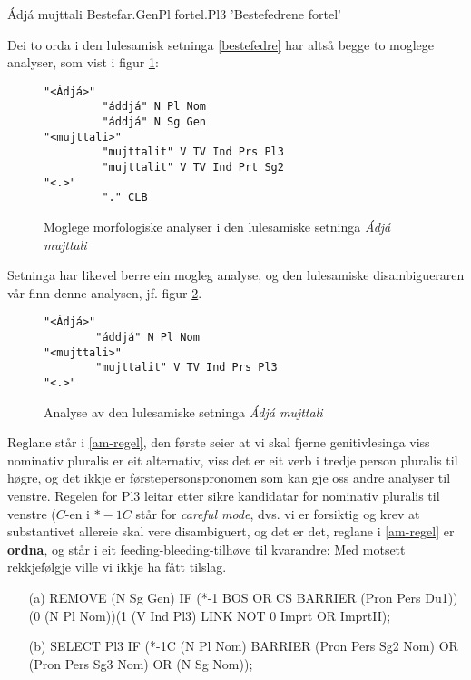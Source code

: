 \documentclass[a4paper,norsk]{article}
\begin{document}
\begin{example}\label{bestefedre}
\gll Ádjá mujttali
    Bestefar.GenPl fortel.Pl3
\glt 'Bestefedrene fortel'    
\glend
\end{example}%

Dei to orda i den lulesamisk setninga \ref{bestefedre} har altså begge to moglege analyser, som vist i figur \ref{am-multi}:

\begin{figure}[htbp]
\begin{center}
\begin{verbatim}
"<Ádjá>"
         "áddjá" N Pl Nom
         "áddjá" N Sg Gen
"<mujttali>"
         "mujttalit" V TV Ind Prs Pl3
         "mujttalit" V TV Ind Prt Sg2
"<.>"
         "." CLB
\end{verbatim}
\caption{Moglege morfologiske analyser i den lulesamiske setninga \textit{Ádjá mujttali}}
\label{am-multi}
\end{center}
\end{figure}

Setninga har likevel berre ein mogleg analyse, og den lulesamiske disambigueraren vår finn denne analysen, jf. figur \ref{am}. %

\begin{figure}[htbp]
\begin{center}
\begin{verbatim}
"<Ádjá>"
        "áddjá" N Pl Nom
"<mujttali>"
        "mujttalit" V TV Ind Prs Pl3
"<.>"
\end{verbatim}
\caption{Analyse av den lulesamiske setninga \textit{Ádjá mujttali}}
\label{am}
\end{center}
\end{figure}

Reglane står i \ref{am-regel}, den første seier at vi skal fjerne genitivlesinga viss nominativ pluralis er eit alternativ, viss det er eit verb i tredje person pluralis til høgre, og det ikkje er førstepersonspronomen som kan gje  oss andre analyser til venstre. Regelen for Pl3 leitar etter sikre kandidatar for nominativ pluralis til venstre ($C$-en i $*-1C$ står for \textit{careful mode}, dvs. vi er forsiktig og krev at substantivet allereie skal vere disambiguert, og det er det, reglane i \ref{am-regel} er \textbf{ordna}, og står i eit feeding-bleeding-tilhøve til kvarandre: Med motsett rekkjefølgje ville vi ikkje ha fått tilslag. %

\begin{example}\label{am-regel}
\begin{itemize}
\item[(a)] REMOVE (N Sg Gen) IF (*-1 BOS OR CS BARRIER (Pron Pers Du1))(0 (N Pl Nom))(1 (V Ind Pl3) LINK NOT 0 Imprt OR ImprtII);
\item[(b)] SELECT Pl3 IF (*-1C (N Pl Nom) BARRIER (Pron Pers Sg2 Nom) OR  (Pron Pers Sg3 Nom) OR (N Sg Nom));
\end{itemize}
\end{example}
\end{document}
